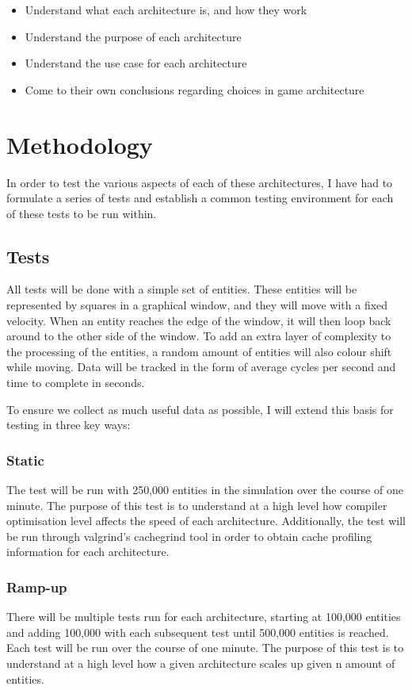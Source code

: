 \documentclass{article}
\begin{document}
\begin{itemize}
    \item Understand what each architecture is, and how they work
    \item Understand the purpose of each architecture
    \item Understand the use case for each architecture
    \item Come to their own conclusions regarding choices in game architecture
\end{itemize}

\section{Methodology}
In order to test the various aspects of each of these architectures, I have had
to formulate a series of tests and establish a common testing environment for
each of these tests to be run within.

\subsection{Tests}
All tests will be done with a simple set of entities. These entities will be
represented by squares in a graphical window, and they will move with a fixed
velocity. When an entity reaches the edge of the window, it will then loop back
around to the other side of the window. To add an extra layer of complexity to
the processing of the entities, a random amount of entities will also colour
shift while moving. Data will be tracked in the form of average cycles per
second and time to complete in seconds.

To ensure we collect as much useful data as possible, I will extend this basis
for testing in three key ways:

\subsubsection{Static}
The test will be run with 250,000 entities in the simulation over the course of
one minute. The purpose of this test is to understand at a high level how
compiler optimisation level affects the speed of each architecture.
Additionally, the test will be run through valgrind's cachegrind tool in order
to obtain cache profiling information for each architecture.

\subsubsection{Ramp-up}
There will be multiple tests run for each architecture, starting at 100,000
entities and adding 100,000 with each subsequent test until 500,000 entities is
reached. Each test will be run over the course of one minute. The purpose of
this test is to understand at a high level how a given architecture scales up
given n amount of entities.
\end{document}
